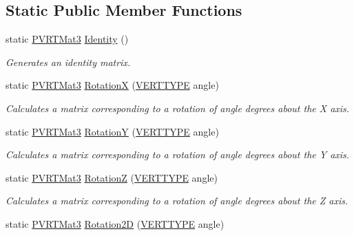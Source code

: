 \subsection*{Static Public Member Functions}
\begin{DoxyCompactItemize}
\item 
static \hyperlink{struct_p_v_r_t_mat3}{P\+V\+R\+T\+Mat3} \hyperlink{struct_p_v_r_t_mat3_abbfb49eb5ab333f1683cb0fb07dd4bbf}{Identity} ()
\begin{DoxyCompactList}\small\item\em Generates an identity matrix. \end{DoxyCompactList}\item 
static \hyperlink{struct_p_v_r_t_mat3}{P\+V\+R\+T\+Mat3} \hyperlink{struct_p_v_r_t_mat3_ad226bf090908a08328eb174d31a26358}{Rotation\+X} (\hyperlink{group___a_p_i___o_g_l_e_s_ga06da457b7d3e93368ab904f89e1396be}{V\+E\+R\+T\+T\+Y\+P\+E} angle)
\begin{DoxyCompactList}\small\item\em Calculates a matrix corresponding to a rotation of angle degrees about the X axis. \end{DoxyCompactList}\item 
static \hyperlink{struct_p_v_r_t_mat3}{P\+V\+R\+T\+Mat3} \hyperlink{struct_p_v_r_t_mat3_a50675e3be1589cedb9f8d1cf81001898}{Rotation\+Y} (\hyperlink{group___a_p_i___o_g_l_e_s_ga06da457b7d3e93368ab904f89e1396be}{V\+E\+R\+T\+T\+Y\+P\+E} angle)
\begin{DoxyCompactList}\small\item\em Calculates a matrix corresponding to a rotation of angle degrees about the Y axis. \end{DoxyCompactList}\item 
static \hyperlink{struct_p_v_r_t_mat3}{P\+V\+R\+T\+Mat3} \hyperlink{struct_p_v_r_t_mat3_a9ea9ba33858e416d4ede0b184fab8bd7}{Rotation\+Z} (\hyperlink{group___a_p_i___o_g_l_e_s_ga06da457b7d3e93368ab904f89e1396be}{V\+E\+R\+T\+T\+Y\+P\+E} angle)
\begin{DoxyCompactList}\small\item\em Calculates a matrix corresponding to a rotation of angle degrees about the Z axis. \end{DoxyCompactList}\item 
static \hyperlink{struct_p_v_r_t_mat3}{P\+V\+R\+T\+Mat3} \hyperlink{struct_p_v_r_t_mat3_a189e048754f97d86a3bb1eeb7999a074}{Rotation2\+D} (\hyperlink{group___a_p_i___o_g_l_e_s_ga06da457b7d3e93368ab904f89e1396be}{V\+E\+R\+T\+T\+Y\+P\+E} angle)

\end{DoxyCompactItemize}
